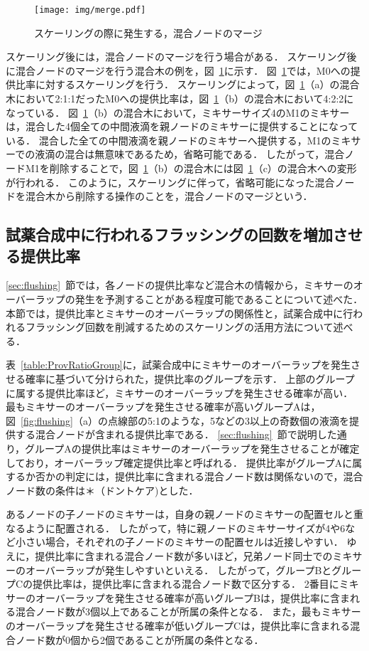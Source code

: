 \begin{figure}[tbp]
 \centering\texttt{[image: img/merge.pdf]}
 \caption{スケーリングの際に発生する，混合ノードのマージ}\label{fig:Merge}
\end{figure}

スケーリング後には，混合ノードのマージを行う場合がある．
スケーリング後に混合ノードのマージを行う混合木の例を，図~\ref{fig:Merge}に示す．
図~\ref{fig:Merge}では，M0への提供比率に対するスケーリングを行う．
スケーリングによって，図~\ref{fig:Merge}（a）の混合木において2:1:1だったM0への提供比率は，図~\ref{fig:Merge}（b）の混合木において4:2:2になっている．
図~\ref{fig:Merge}（b）の混合木において，ミキサーサイズ4のM1のミキサーは，混合した4個全ての中間液滴を親ノードのミキサーに提供することになっている．
混合した全ての中間液滴を親ノードのミキサーへ提供する，M1のミキサーでの液滴の混合は無意味であるため，省略可能である．
したがって，混合ノードM1を削除することで，図~\ref{fig:Merge}（b）の混合木には図~\ref{fig:Merge}（c）の混合木への変形が行われる．
このように，スケーリングに伴って，省略可能になった混合ノードを混合木から削除する操作のことを，混合ノードのマージという．

\subsection{試薬合成中に行われるフラッシングの回数を増加させる提供比率}\label{ratio}
\ref{sec:flushing}~節では，各ノードの提供比率など混合木の情報から，ミキサーのオーバーラップの発生を予測することがある程度可能であることについて述べた．
本節では，提供比率とミキサーのオーバーラップの関係性と，試薬合成中に行われるフラッシング回数を削減するためのスケーリングの活用方法について述べる．

表~\ref{table:ProvRatioGroup}に，試薬合成中にミキサーのオーバーラップを発生させる確率に基づいて分けられた，提供比率のグループを示す．
上部のグループに属する提供比率ほど，ミキサーのオーバーラップを発生させる確率が高い．
最もミキサーのオーバーラップを発生させる確率が高いグループAは，図~\ref{fig:flushing}（a）の点線部の5:1のような，5などの3以上の奇数個の液滴を提供する混合ノードが含まれる提供比率である．
\ref{sec:flushing}~節で説明した通り，グループAの提供比率はミキサーのオーバーラップを発生させることが確定しており，オーバーラップ確定提供比率と呼ばれる．
提供比率がグループAに属するか否かの判定には，提供比率に含まれる混合ノード数は関係ないので，混合ノード数の条件は＊（ドントケア)とした．

あるノードの子ノードのミキサーは，自身の親ノードのミキサーの配置セルと重なるように配置される．
したがって，特に親ノードのミキサーサイズが4や6など小さい場合，それぞれの子ノードのミキサーの配置セルは近接しやすい．
ゆえに，提供比率に含まれる混合ノード数が多いほど，兄弟ノード同士でのミキサーのオーバーラップが発生しやすいといえる．
したがって，グループBとグループCの提供比率は，提供比率に含まれる混合ノード数で区分する．
2番目にミキサーのオーバーラップを発生させる確率が高いグループBは，提供比率に含まれる混合ノード数が3個以上であることが所属の条件となる．
また，最もミキサーのオーバーラップを発生させる確率が低いグループCは，提供比率に含まれる混合ノード数が0個から2個であることが所属の条件となる．

